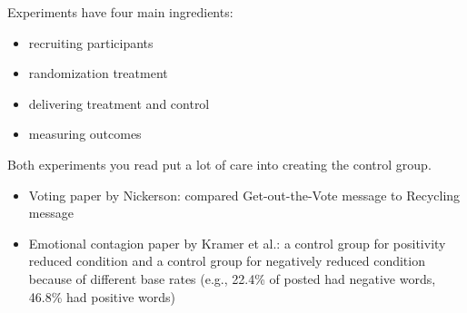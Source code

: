 \documentclass[aspectratio=169]{beamer}
\begin{document}
\begin{frame}

\begin{center}
\end{center}

\end{frame}
\begin{frame}

Experiments have four main ingredients:
\begin{itemize}
\item recruiting participants \pause
\item randomization treatment \pause
\item delivering treatment and control \pause
\item measuring outcomes 
\end{itemize}

\end{frame}
\begin{frame}

Both experiments you read put a lot of care into creating the control group.
\begin{itemize}
\item Voting paper by Nickerson: compared Get-out-the-Vote message to Recycling message \pause
\item Emotional contagion paper by Kramer et al.: a control group for positivity reduced condition and a control group for negatively reduced condition because of different base rates (e.g., 22.4\% of posted had negative words, 46.8\% had positive words)
\end{itemize}

\end{frame}
\end{document}
